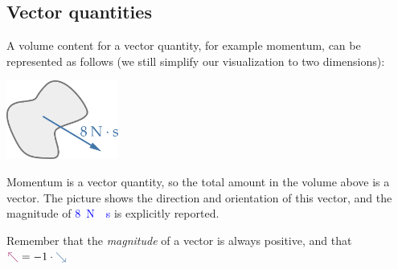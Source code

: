 \documentclass[a4paper,12pt,%
onecolumn,oneside,%
british%
]{memoir}
\renewcommand*{\|}[1][]{\nonscript\:#1\vert\nonscript\:\mathopen{}}
\begin{document}
\subsection{Vector quantities}\label{sec:volintegral_vector}

A volume content for a vector quantity, for example momentum, can be represented as follows (we still simplify our visualization to two dimensions):
\begin{center}
  \includegraphics[height=7em]{images/volumeintegral_8Ns.pdf}
\end{center}
Momentum is a vector quantity, so the total amount in the volume above is a vector. The picture shows the direction and orientation of this vector, and the magnitude of \textcolor{blue}{\qty{8}{N\cdot s}}
is explicitly reported.
\begin{warning}
  Remember that the \emph{magnitude} of a vector is always positive, and that\quad $\mathord{\mathcolor{purple}{\nwarrow}} = -1\cdot\mathord{\mathcolor{blue}{\searrow}}$
\end{warning}
\end{document}
